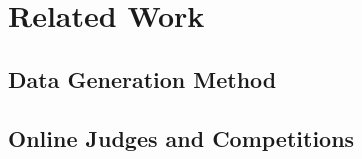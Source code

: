 \chapter{Related Work}
\label{ch:related}

\section{Data Generation Method}

\section{Online Judges and Competitions}

